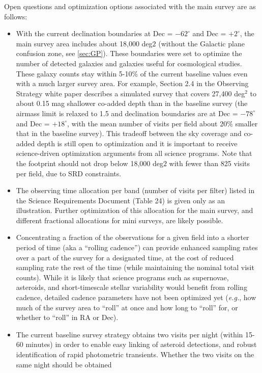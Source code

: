 \documentclass[DM,lsstdraft,toc,usenatbib]{lsstdoc}
\begin{document}
Open questions and optimization options associated with the main survey are as follows: 
\begin{itemize}
\item With the current declination boundaries at Dec = $-62^\circ$ and Dec = $+2^\circ$,
the main survey area includes about 18,000 deg$2$ (without the Galactic plane 
confusion zone, see \ref{sec:GP}). These boundaries were set to optimize the number of
detected galaxies and galaxies useful for cosmological studies. These galaxy counts 
stay within 5-10\% of the current baseline values even with a much larger survey area. 
For example, Section 2.4 in the Observing Strategy white paper describes a simulated survey
that covers 27,400 deg$^2$ to about 0.15 mag shallower co-added depth than in the baseline 
survey (the airmass limit is relaxed to 1.5 and declination boundaries are at Dec = $-78^\circ$ 
and Dec = $+18^\circ$, with the mean number of visits per field about 20\% smaller that
in the baseline survey). This tradeoff between the sky coverage and co-added depth is still
open to optimization and it is important to receive science-driven optimization arguments
from all science programs.  Note that the footprint should not drop below 18,000 deg$2$ with fewer
than 825 visits per field, due to SRD constraints.
\item The observing time allocation per band (number of visits per filter) listed in the Science Requirements Document
(Table 24) is given only as an illustration. Further optimization of this allocation for the main 
survey, and different fractional allocations for mini surveys, are likely possible. 
\item Concentrating a fraction of the observations for a given field into a shorter period of time
(aka a ``rolling cadence'') can provide enhanced
sampling rates over a part of the survey for a designated time, at the
cost of reduced sampling rate the rest of the time (while maintaining the nominal total 
visit counts). While it is likely that science programs such as supernovae, asteroids, and
short-timescale stellar variability would benefit from rolling cadence, detailed cadence
parameters have not been optimized yet ({\it e.g.}, how much of the 
survey area to ``roll'' at once and how long to ``roll'' for, or whether to ``roll'' in RA or Dec). 
\item The current baseline survey strategy obtains two visits per night (within 15-60 minutes) in 
order to enable easy linking of asteroid detections, and robust identification of rapid 
photometric transients. Whether the two visits on the same night should be obtained 

\end{itemize}
\end{document}
